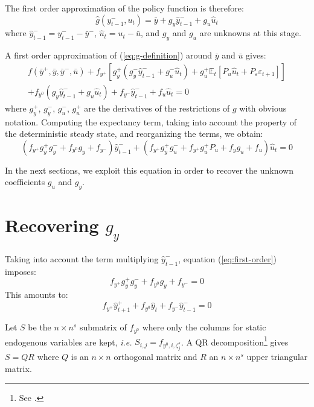 \documentclass[11pt,a4paper]{article}
\begin{document}
The first order approximation of the policy function is therefore:
\begin{equation*}
  \hat{g}(y^-_{t-1}, u_t) = \bar{y} + g_y \hat{y}^-_{t-1} + g_u \hat{u}_t
\end{equation*}
where $\hat{y}^-_{t-1} = y^-_{t-1} - \bar{y}^-$, $\hat{u}_t = u_t - \bar{u}$,
and $g_y$ and $g_u$ are unknowns at this stage.

A first order approximation of (\ref{eq:g-definition}) around $\bar{y}$ and
$\bar{u}$ gives:
\begin{multline*}
  f(\bar{y}^+, \bar{y}, \bar{y}^-, \bar{u}) + f_{y^+} [g^+_y(g^-_y
  \hat{y}^-_{t-1} + g^-_u \hat{u}_t) + g^+_u \mathbb{E}_t [P_u \hat{u}_t +
  P_\varepsilon \varepsilon_{t+1}] ] \\ + f_{y^0} (g_y \hat{y}^-_{t-1} + g_u \hat{u}_t) + f_{y^-}\hat{y}^-_{t-1} + f_u \hat{u}_t = 0
\end{multline*}
where $g^+_y$, $g^-_y$, $g^-_u$, $g^+_u$ are the derivatives of the
restrictions of $g$ with obvious notation. Computing the expectancy term,
taking into account the property of the deterministic steady state, and
reorganizing the terms, we obtain:
\begin{equation}
  \label{eq:first-order}
  (f_{y^+} g^+_y g^-_y + f_{y^0}  g_y + f_{y^-}) \hat{y}^-_{t-1} + (f_{y^+} g^+_yg^-_u+ f_{y^+}g^+_u P_u + f_y g_u + f_u) \hat{u}_t = 0
\end{equation}

In the next sections, we exploit this equation in order to recover the unknown
coefficients $g_u$ and $g_y$.

\section{Recovering $g_y$}
\label{sec:g-y}

Taking into account the term multiplying $\hat{y}^-_{t-1}$, equation
(\ref{eq:first-order}) imposes:
\begin{equation*}
  f_{y^+} g^+_y g^-_y + f_{y^0}  g_y + f_{y^-} = 0
\end{equation*}
This amounts to:
\begin{equation}
  \label{eq:gy}
  f_{y^+} \hat{y}^+_{t+1} + f_{y^0} \hat{y}_t + f_{y^-} \hat{y}^-_{t-1} = 0
\end{equation}

Let $S$ be the $n\times n^s$ submatrix of $f_{y^0}$ where only the columns for
static endogenous variables are kept, \textit{i.e.} $S_{i,j} = f_{y^0, i,
  \zeta^s_j}$. A QR decomposition\footnote{See \citet[section
  5.2]{golub/van-loan:1996}.} gives $S = QR$ where $Q$ is an $n\times n$
orthogonal matrix and $R$ an $n\times n^s$ upper triangular matrix.
\end{document}
